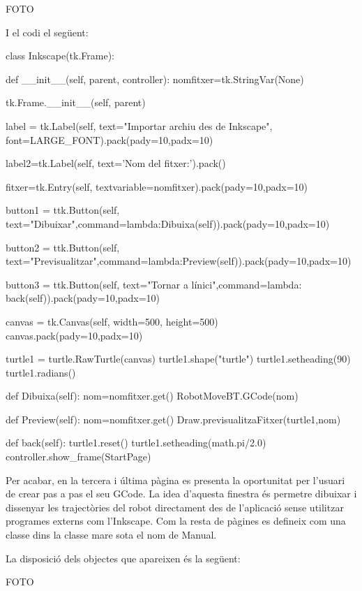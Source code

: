 FOTO 

I el codi el següent:

\begin{python}
	class Inkscape(tk.Frame):
	
		def __init__(self, parent, controller):
			nomfitxer=tk.StringVar(None)
			
			tk.Frame.__init__(self, parent)
			
			
			label = tk.Label(self, text="Importar archiu des de Inkscape", font=LARGE_FONT).pack(pady=10,padx=10)
			
			label2=tk.Label(self, text='Nom del fitxer:').pack()
			
			fitxer=tk.Entry(self, textvariable=nomfitxer).pack(pady=10,padx=10)
			
			button1 = ttk.Button(self, text="Dibuixar",command=lambda:Dibuixa(self)).pack(pady=10,padx=10)
			
			button2 = ttk.Button(self, text="Previsualitzar",command=lambda:Preview(self)).pack(pady=10,padx=10)
			
			button3 = ttk.Button(self, text="Tornar a l\'inici",command=lambda: back(self)).pack(pady=10,padx=10)
			
			canvas = tk.Canvas(self, width=500, height=500)
			canvas.pack(pady=10,padx=10)
			
			turtle1 = turtle.RawTurtle(canvas)
			turtle1.shape("turtle")
			turtle1.setheading(90)
			turtle1.radians()
		
		def Dibuixa(self):
			nom=nomfitxer.get()
			RobotMoveBT.GCode(nom)
		
		def Preview(self):
			nom=nomfitxer.get()
			Draw.previsualitzaFitxer(turtle1,nom)
			
		def back(self):
			turtle1.reset()
			turtle1.setheading(math.pi/2.0)
			controller.show_frame(StartPage)
\end{python}

Per acabar, en la tercera i última pàgina es presenta la oportunitat per l’usuari de crear pas a pas el seu GCode. La idea d’aquesta finestra és permetre dibuixar i dissenyar les trajectòries del robot directament des de l’aplicació sense utilitzar programes externs com l’Inkscape. Com la resta de pàgines es defineix com una classe dins la classe mare sota el nom de Manual. 

La disposició dels objectes que apareixen és la següent:

FOTO

